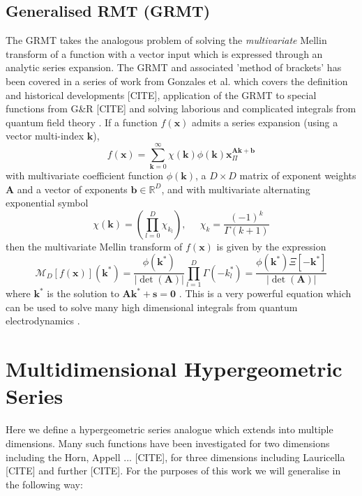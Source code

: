 \documentclass{article}
\begin{document}
\subsection{Generalised RMT (GRMT)}
The GRMT takes the analogous problem of solving the \textit{multivariate} Mellin transform of a function with a vector input which is expressed through an analytic series expansion. The GRMT and associated 'method of brackets' has been covered in a series of work from {\color{red}Gonzales et al.} \citep{Gonzalez2015} which covers the definition and historical developments [CITE], application of the GRMT to special functions from G\&R [CITE] and solving laborious and complicated integrals from quantum field theory \citep{Gonzalez2011}. If a function $f(\mathbf{x})$ admits a series expansion (using a vector multi-index $\mathbf{k}$),  \begin{equation}
f(\mathbf{x}) = \sum_{\mathbf{k}=0}^\infty \chi(\mathbf{k}) \phi(\mathbf{k}) \mathbf{x}^{\mathbf{A}\mathbf{k}+ \mathbf{b}}_\Pi
\end{equation}
with multivariate coefficient function $\phi(\mathbf{k})$, a $D\times D$ matrix of exponent weights $\mathbf{A}$ and a vector of exponents $\mathbf{b} \in \mathbb{R}^D$, and with multivariate alternating exponential symbol
\begin{equation}
\chi(\mathbf{k}) = \left(\prod_{l=0}^D \chi_{k_l}\right),\;\;\;\;\; \chi_k = \frac{(-1)^k}{\Gamma(k+1)}
\end{equation}
then the multivariate Mellin transform of $f(\mathbf{x})$ is given by the expression \begin{equation}
\mathcal{M}_D[f(\mathbf{x})](\mathbf{k}^*) = \frac{\phi(\mathbf{k}^*)}{|\det(\mathbf{A})|} \prod_{l=1}^D \Gamma(-k_l^*) = \frac{\phi(\mathbf{k}^*)\Xi[-\mathbf{k}^*]}{|\det(\mathbf{A})|}
\end{equation}
where $\mathbf{k}^*$ is the solution to $\mathbf{A}\mathbf{k^*}+\mathbf{s}=\mathbf{0}$ \citep{Gonzalez2015}. This is a very powerful equation which can be used to solve many high dimensional integrals from quantum electrodynamics \citep{Gonzalez2011}.

\section{Multidimensional Hypergeometric Series}
Here we define a hypergeometric series analogue which extends into multiple dimensions. Many such functions have been investigated for two dimensions including the Horn, Appell ... [CITE], for three dimensions including Lauricella [CITE] and further [CITE]. For the purposes of this work we will generalise in the following way:
\end{document}
